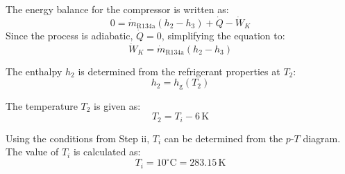 The energy balance for the compressor is written as:  
\[
0 = \dot{m}_{\text{R134a}} (h_2 - h_3) + \dot{Q} - \dot{W}_K  
\]  
Since the process is adiabatic, \( \dot{Q} = 0 \), simplifying the equation to:  
\[
\dot{W}_K = \dot{m}_{\text{R134a}} (h_2 - h_3)  
\]  

The enthalpy \( h_2 \) is determined from the refrigerant properties at \( T_2 \):  
\[
h_2 = h_{\text{g}}(T_2)  
\]  

The temperature \( T_2 \) is given as:  
\[
T_2 = T_i - 6 \, \text{K}  
\]  

Using the conditions from Step ii, \( T_i \) can be determined from the \( p \)-\( T \) diagram. The value of \( T_i \) is calculated as:  
\[
T_i = 10^\circ\text{C} = 283.15 \, \text{K}  
\]